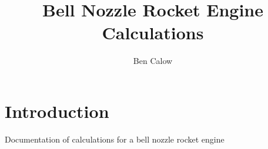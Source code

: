 \documentclass{article}
\title{Bell Nozzle Rocket Engine Calculations}
\author{Ben Calow}
\begin{document}
\clearpage\maketitle
\thispagestyle{empty}

\pagebreak

\setcounter{page}{1}

\tableofcontents

\pagebreak

\begingroup
\begin{center}
\end{center}
\endgroup

\pagebreak

\section{Introduction}

Documentation of calculations for a bell nozzle rocket engine
\end{document}
